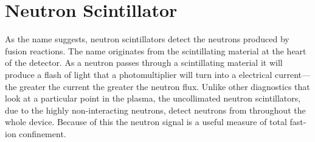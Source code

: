 \section{Neutron Scintillator}
As the name suggests, neutron scintillators detect the neutrons produced by fusion reactions. The name originates from the scintillating material at the heart of the detector. As a neutron passes through a scintillating material it will produce a flash of light that a photomultiplier will turn into a electrical current---the greater the current the greater the neutron flux. Unlike other diagnostics that look at a particular point in the plasma, the uncollimated neutron scintillators, due to the highly non-interacting neutrons, detect neutrons from throughout the whole device. Because of this the neutron signal is a useful measure of total fast-ion confinement.

